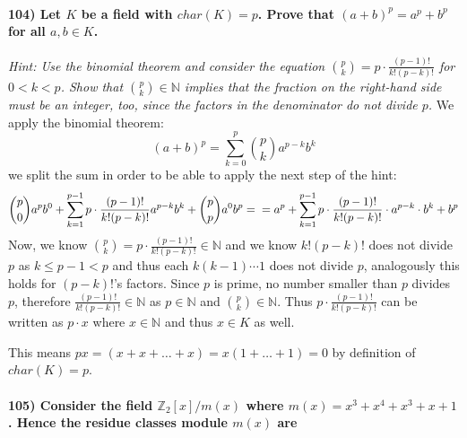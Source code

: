 \documentclass[
]{article}
\begin{document}
\hypertarget{let-k-be-a-field-with-chark-p.-prove-that-abp-ap-bp-for-all-ab-in-k.}{%
\paragraph{\texorpdfstring{104) Let \(K\) be a field with
\(char(K) = p\). Prove that \((a+b)^p = a^p + b^p\) for all
\(a,b \in K\).}{104) Let K be a field with char(K) = p. Prove that (a+b)\^{}p = a\^{}p + b\^{}p for all a,b \textbackslash in K.}}\label{let-k-be-a-field-with-chark-p.-prove-that-abp-ap-bp-for-all-ab-in-k.}}

\emph{Hint: Use the binomial theorem and consider the equation
\(\binom{p}{k} = p \cdot \frac{(p-1)!}{k!(p-k)!}\) for \(0 < k < p\).
Show that \(\binom{p}{k} \in \mathbb{N}\) implies that the fraction on
the right-hand side must be an integer, too, since the factors in the
denominator do not divide \(p\).} We apply the binomial theorem: \[
(a+b)^p = \sum_{k=0}^p \binom{p}{k} a^{p-k} b^k 
\] we split the sum in order to be able to apply the next step of the
hint: \[
\binom{p}{0} a^pb^0 + \sum_{k=1}^{p-1} p\cdot \frac{(p-1)!}{k!(p-k)!} a^{p-k}b^k + \binom{p}{p}a^0 b^p = \\
= a^p + \sum_{k=1}^{p-1} p \cdot \frac{(p-1)!}{k!(p-k)!} \cdot a^{p-k} \cdot b^k + b^p
\] Now, we know
\(\binom{p}{k} = p \cdot \frac{(p-1)!}{k!(p-k)!} \in \mathbb{N}\) and we
know \(k!(p-k)!\) does not divide \(p\) as \(k \leq p-1 < p\) and thus
each \(k (k-1) \cdots 1\) does not divide \(p\), analogously this holds
for \((p-k)!\)'s factors. Since \(p\) is prime, no number smaller than
\(p\) divides \(p\), therefore
\(\frac{(p-1)!}{k!(p-k)!} \in \mathbb{N}\) as \(p \in \mathbb{N}\) and
\(\binom{p}{k} \in \mathbb{N}\). Thus
\(p \cdot \frac{(p-1)!}{k!(p-k)!}\) can be written as \(p \cdot x\)
where \(x \in \mathbb{N}\) and thus \(x \in K\) as well.

This means \(px = (x + x + \dots + x) = x(1+ \dots + 1) = 0\) by
definition of \(char(K) = p\).

\hypertarget{consider-the-field-mathbbz_2x-mx-where-mx-x3-x4-x3-x-1.-hence-the-residue-classes-module-mx-are}{%
\paragraph{\texorpdfstring{105) Consider the field
\(\mathbb{Z}_2[x] / m(x)\) where \(m(x) = x^3 + x^4 + x^3 + x +1\).
Hence the residue classes module \(m(x)\)
are}{105) Consider the field \textbackslash mathbb\{Z\}\_2{[}x{]} / m(x) where m(x) = x\^{}3 + x\^{}4 + x\^{}3 + x +1. Hence the residue classes module m(x) are}}\label{consider-the-field-mathbbz_2x-mx-where-mx-x3-x4-x3-x-1.-hence-the-residue-classes-module-mx-are}}
\end{document}

